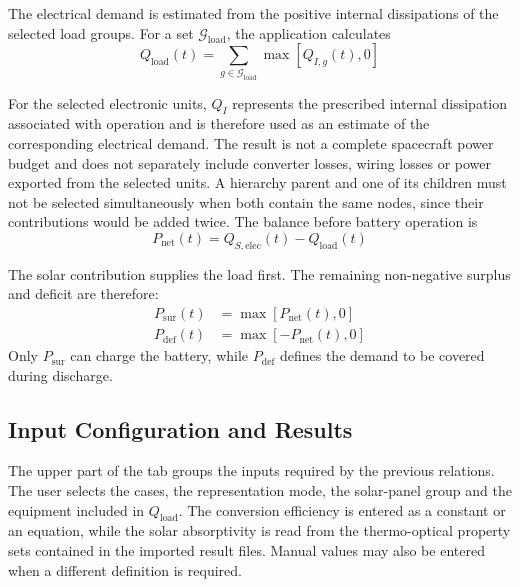 The electrical demand is estimated from the positive internal dissipations of
the selected load groups. For a set $\mathcal{G}_{\mathrm{load}}$, the
application calculates
\begin{equation}
    Q_{\mathrm{load}}(t)
    =
    \sum_{g\in\mathcal{G}_{\mathrm{load}}}
    \max\!\left[Q_{I,g}(t),0\right]
    \label{eq:electrical_load_ch8}
\end{equation}

For the selected electronic units, $Q_I$ represents the prescribed internal
dissipation associated with operation and is therefore used as an estimate of
the corresponding electrical demand. The result is not a complete spacecraft
power budget and does not separately include converter losses, wiring losses
or power exported from the selected units. A hierarchy parent and one of its
children must not be selected simultaneously when both contain the same nodes,
since their contributions would be added twice.\newline
The balance before battery operation is
\begin{equation}
    P_{\mathrm{net}}(t)
    =
    Q_{S,\mathrm{elec}}(t)-Q_{\mathrm{load}}(t)
    \label{eq:net_electrical_power_ch8}
\end{equation}

The solar contribution supplies the load first. The remaining non-negative
surplus and deficit are therefore:
\begin{align}
    P_{\mathrm{sur}}(t)
    &=
    \max\!\left[P_{\mathrm{net}}(t),0\right]
    \label{eq:solar_surplus_ch8}
    \\
    P_{\mathrm{def}}(t)
    &=
    \max\!\left[-P_{\mathrm{net}}(t),0\right]
    \label{eq:electrical_deficit_ch8}
\end{align}
Only $P_{\mathrm{sur}}$ can charge the battery, while
$P_{\mathrm{def}}$ defines the demand to be covered during discharge.


\subsection{Input Configuration and Results}
\label{subsec:solar_balance_inputs_outputs}

The upper part of the tab groups the inputs required by the previous
relations. The user selects the cases, the representation mode, the
solar-panel group and the equipment included in $Q_{\mathrm{load}}$. The
conversion efficiency is entered as a constant or an equation, while the
solar absorptivity is read from the thermo-optical property sets contained in
the imported result files. Manual values may also be entered when a different
definition is required.

